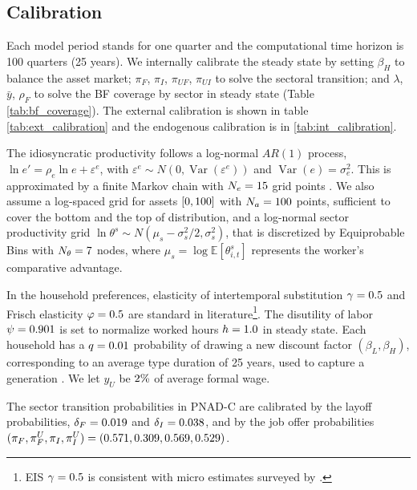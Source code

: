 \documentclass[12pt]{article}
\newcommand{\E}{\mathbb{E}}
\DeclareMathOperator{\Var}{Var}
\begin{document}
\subsection*{Calibration}




Each model period stands for one quarter and the computational time horizon is 100
quarters (25 years). We internally calibrate the steady state by setting $\beta_H$ to
balance the asset market; $\pi_F$, $\pi_I$, $\pi_{UF}$, $\pi_{UI}$ to solve the sectoral
transition; and $\lambda$, $\bar y$, $\rho_F$ to solve the BF coverage by sector in
steady state (Table \ref{tab:bf_coverage}). The external calibration is shown in table
\ref{tab:ext_calibration} and the endogenous calibration is in
\ref{tab:int_calibration}.

The idiosyncratic productivity follows a log-normal $AR(1)$ process,
$\ln e' = \rho_e \ln e + \varepsilon^e$, with
$\varepsilon^e \sim N(0,\Var(\varepsilon^e))$ and $\Var(e) = \sigma^2_e$. This is
approximated by a finite Markov chain with $N_e = 15$ grid points
\parencite{rouwenhorst1995asset}. We also assume a log-spaced grid for assets
$[0, 100]$ with $N_a = 100$ points, sufficient to cover the bottom and the top
of distribution, and a log-normal sector productivity grid
$\ln \theta^s \sim N(\mu_s - \sigma_s^2/2, \sigma_s^2)$, that is discretized by
Equiprobable Bins with $N_\theta = 7$ nodes, where
$\mu_s = \log \E\!\left[\theta^s_{i,t}\right]$ represents the worker's comparative
advantage.

In the household preferences, elasticity of intertemporal substitution $\gamma=0.5$
and Frisch elasticity $\varphi = 0.5$ are standard in literature\footnote{ EIS
$\gamma=0.5$ is consistent with micro estimates surveyed by
\textcite{havranek2015cross}.}. The disutility of labor $\psi = 0.901$ is set to
normalize worked hours $h = 1.0$ in steady state. Each household has a $q = 0.01$
probability of drawing a new discount factor $(\beta_L, \beta_H)$, corresponding to an
average type duration of 25 years, used to capture a generation
\parencite{auclert2025fiscal}. We let $y_U$ be $2\%$ of average formal wage.

The sector transition probabilities in PNAD-C are calibrated by the layoff
probabilities, $\delta_F = 0.019$ and $\delta_I = 0.038$, and by the job offer
probabilities $(\pi_F, \pi_F^U, \pi_I, \pi_I^U) = (0.571, 0.309, 0.569, 0.529)$.
\end{document}
